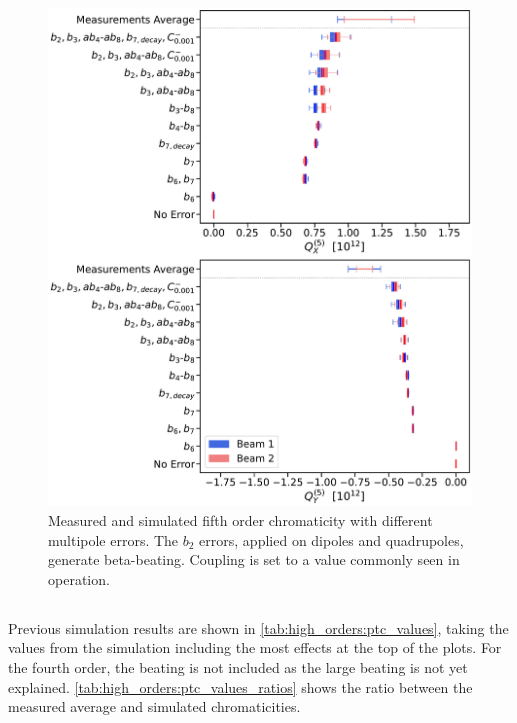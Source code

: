 \begin{figure}[!htb]
    \centering
    \includegraphics[width=0.9\columnwidth]{images/q5_ptc.pdf}
    \caption{Measured and simulated fifth order chromaticity with different multipole errors. The
    $b_2$ errors, applied on dipoles and quadrupoles, generate beta-beating. Coupling is set to a
    value commonly seen in operation.}
    \label{fig:high_orders:beam1_q5_ptc}
\end{figure}



\subsection{}

Previous simulation results are shown in \cref{tab:high_orders:ptc_values}, taking the values from 
the simulation including the most effects at the top of the plots. For the fourth order, the beating
is not included as the large beating is not yet explained.
\cref{tab:high_orders:ptc_values_ratios} shows the ratio between the measured average and simulated
chromaticities.

